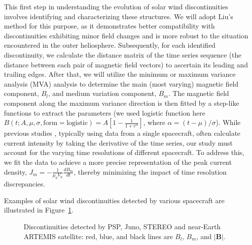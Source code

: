 \documentclass[
  letterpaper,
  DIV=11,
  numbers=noendperiod]{scrartcl}
\begin{document}
This first step in understanding the evolution of solar wind discontinuities involves identifying and characterizing these structures. We will adopt Liu's method \citep{liuMagneticDiscontinuitiesSolar2022} for this purpose, as it demonstrates better compatibility with discontinuities exhibiting minor field changes and is more robust to the situation encountered in the outer heliosphere.
Subsequently, for each identified discontinuity, we calculate the distance matrix of the time series sequence (the distance between each pair of magnetic field vectors) to ascertain its leading and trailing edges.
After that, we will utilize the minimum or maximum variance analysis (MVA) analysis \citep{sonnerupMinimumMaximumVariance1998, sonnerupMagnetopauseStructureAttitude1967} to determine the main (most varying) magnetic field component, \(B_l\), and medium variation component, \(B_m\).
The magnetic field component along the maximum variance direction is then fitted by a step-like functions to extract the parameters (we used logistic function here \(B(t; A, \mu, \sigma, {\mathrm{form=logistic}}) = A \left[1 - \frac{1}{1 + e^{\alpha}} \right]\), where \(\alpha = (t - \mu)/{\sigma}\)).
While previous studies \citep{vaskoKineticscaleCurrentSheets2021, vaskoKineticscaleCurrentSheets2022}, typically using data from a single spacecraft, often calculate current intensity by taking the derivative of the time series, our study must account for the varying time resolutions of different spacecraft. To address this, we fit the data to achieve a more precise representation of the peak current density, \(J_m = - \frac{1}{\mu_0 V_n} \frac{d B_m}{d t}\), thereby minimizing the impact of time resolution discrepancies.

Examples of solar wind discontinuities detected by various spacecraft are illustrated in Figure~\ref{fig-examples}.

\begin{figure}


\caption{\label{fig-examples}Discontinuities detected by PSP, Juno, STEREO and near-Earth ARTEMIS satellite: red, blue, and black lines are \(B_l\), \(B_m\), and \(|{\mathbf B}|\).}

\end{figure}%
\end{document}
